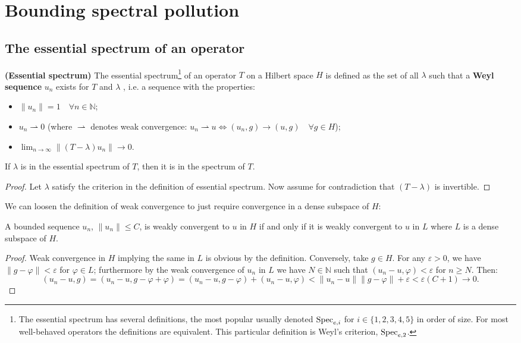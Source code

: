 \documentclass[../main.tex]{subfiles}
\begin{document}
\section{Bounding spectral pollution}

\subsection{The essential spectrum of an operator}
\begin{definition}{\textbf{(Essential spectrum)}}
The essential spectrum\footnote{The essential spectrum has several definitions, 
the most popular usually denoted $\mathrm{Spec}_{e,i}$ for $i \in \{1,2,3,4,5\}$ in order of size. For 
most well-behaved operators the definitions are equivalent. This particular definition 
is Weyl's criterion, $\mathrm{Spec}_{e, 2}$.} of an operator $T$ on a Hilbert space $H$ 
is defined as the set of all $\lambda$ such that a \textbf{Weyl sequence} $u_n$ exists for $T$ and $\lambda$ , i.e. a sequence with the properties:
\begin{itemize}
\item $\|u_n\| = 1\quad \forall n \in \mathbb{N}$;
\item $u_n \rightharpoonup 0$ (where $\rightharpoonup$ denotes weak convergence: $u_n \rightharpoonup u \Leftrightarrow (u_n, g) \rightarrow (u, g) \quad \forall g \in H$);
\item $\lim_{n \rightarrow \infty}\|(T - \lambda)u_n\|  \rightarrow 0$.
\end{itemize}
\end{definition}

\begin{proposition}\label{thm:ess-in-spec}
If $\lambda$ is in the essential spectrum of $T$, then it is in the spectrum of $T$.
\end{proposition}
\begin{proof}
Let $\lambda$ satisfy the criterion in the definition of essential spectrum. Now assume for contradiction that $(T - \lambda)$ is invertible.
\end{proof}

We can loosen the definition of weak convergence to just require convergence in a dense subspace of $H$:
\begin{lemma}\label{thm:weak-conv-dense-subset}
A bounded sequence $u_n$, $\|u_n\| \leq C$, is weakly convergent to $u$ in $H$ if and only if it is weakly convergent to $u$ in $L$ where $L$ is a dense subspace of $H$.
\end{lemma}
\begin{proof}
Weak convergence in $H$ implying the same in $L$ is obvious by the definition. 
Conversely, take $g \in H$. For any $\varepsilon > 0$, we have $\|g - \varphi\| < \varepsilon$ for $\varphi \in L$; furthermore by the weak convergence of $u_n$ in $L$ we have $N \in \mathbb{N}$ such that $(u_n - u, \varphi) < \varepsilon$ for $n \geq N$. Then:
$$( u_n - u, g ) = ( u_n - u, g - \varphi + \varphi ) = ( u_n - u, g - \varphi ) + ( u_n - u, \varphi ) < \|u_n - u\| \|g - \varphi\| + \varepsilon < \varepsilon(C + 1) \rightarrow 0.$$
\end{proof}
\end{document}

